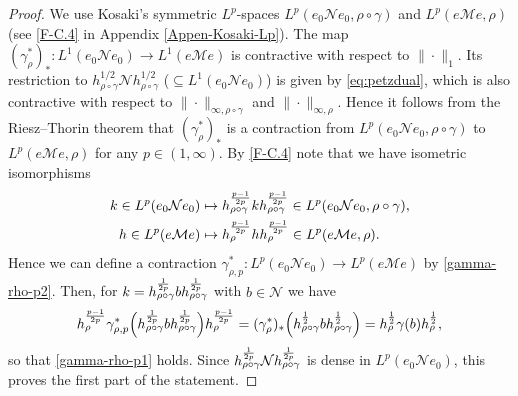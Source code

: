 \documentclass[12pt]{article}
\theoremstyle{definition}
\theoremstyle{remark}
\numberwithin{equation}{section}
\def\Me{\mathcal M}
\def\Ne{\mathcal N}
\begin{document}
\begin{proof}

We use Kosaki's symmetric $L^p$-spaces $L^p(e_0\Ne e_0,\rho\circ\gamma)$ and
$L^p(e\Me e,\rho)$ (see \eqref{F-C.4} in Appendix \ref{Appen-Kosaki-Lp}). The map
$(\gamma_\rho^*)_*:L^1(e_0\Ne e_0)\to L^1(e\Me e)$ is contractive
with respect to $\|\cdot\|_1$. Its restriction to $h_{\rho\circ\gamma}^{1/2}\Ne h_{\rho\circ\gamma}^{1/2}$
($\subseteq L^1(e_0\Ne e_0)$) is given by \eqref{eq:petzdual}, which is also contractive with respect
to $\|\cdot\|_{\infty,\rho\circ\gamma}$ and $\|\cdot\|_{\infty,\rho}$. Hence it follows from the Riesz--Thorin
theorem that $(\gamma_\rho^*)_*$ is a contraction from $L^p(e_0\Ne e_0,\rho\circ\gamma)$ to
$L^p(e\Me e,\rho)$ for any $p\in(1,\infty)$. By \eqref{F-C.4} note that we have isometric isomorphisms
\begin{align*}
k\in L^p(e_0\Ne e_0)&\mapsto h_{\rho\circ\gamma}^{p-1\over2p}kh_{\rho\circ\gamma}^{p-1\over2p}
\in L^p(e_0\Ne e_0,\rho\circ\gamma), \\
h\in L^p(e\Me e)&\mapsto h_\rho^{p-1\over2p}hh_\rho^{p-1\over2p}\in L^p(e\Me e,\rho).
\end{align*}
Hence we can define a contraction $\gamma_{\rho,p}^*:L^p(e_0\Ne e_0)\to L^p(e\Me e)$ by
\eqref{gamma-rho-p2}. Then, for $k=h_{\rho\circ\gamma}^{1\over2p}bh_{\rho\circ\gamma}^{1\over2p}$
with $b\in\Ne$ we have
\[
h_\rho^{p-1\over2p}\gamma_{\rho,p}^*\Bigl(h_{\rho\circ\gamma}^{1\over2p}b
h_{\rho\circ\gamma}^{1\over2p}\Bigr)h_\rho^{p-1\over2p}
=(\gamma_\rho^*)_*\Bigl(h_{\rho\circ\gamma}^{1\over2}bh_{\rho\circ\gamma}^{1\over2}\Bigr)
=h_\rho^{1\over2}\gamma(b)h_\rho^{1\over2},
\]
so that \eqref{gamma-rho-p1} holds.
Since $h_{\rho\circ\gamma}^{1\over 2p}\Ne h^{1\over
2p}_{\rho\circ\gamma}$ is dense in $L^p(e_0 \Ne e_0)$, this proves the first part of the statement.


\end{proof}
\end{document}
